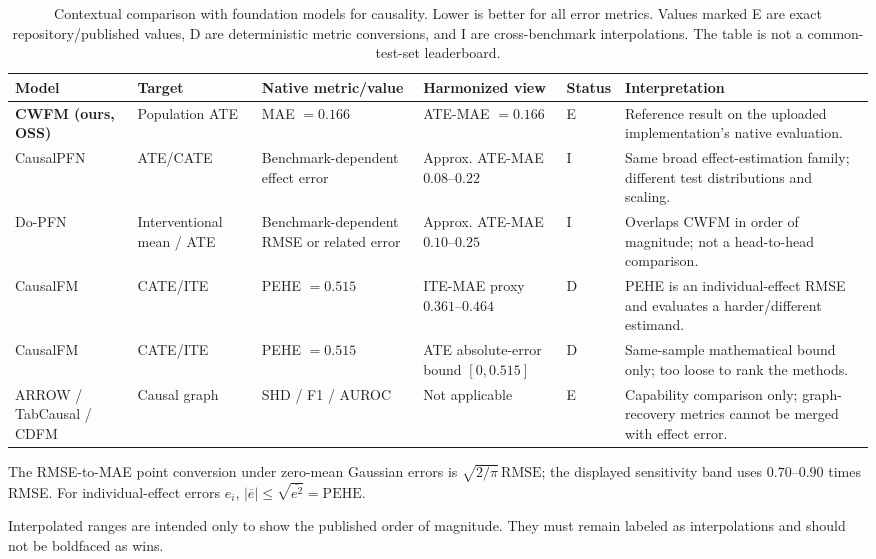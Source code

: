 \begin{table}[t]
\centering
\small
\begin{threeparttable}
\caption{Contextual comparison with foundation models for causality. Lower is better for all error metrics. Values marked E are exact repository/published values, D are deterministic metric conversions, and I are cross-benchmark interpolations. The table is not a common-test-set leaderboard.}
\label{tab:causality-fm-comparison}
\begin{tabularx}{\textwidth}{l l l l l X}
\toprule
Model & Target & Native metric/value & Harmonized view & Status & Interpretation \\
\midrule
\textbf{CWFM (ours, OSS)} & Population ATE & MAE $=\mathbf{0.166}$ & ATE-MAE $=\mathbf{0.166}$ & E & Reference result on the uploaded implementation's native evaluation. \\
CausalPFN & ATE/CATE & Benchmark-dependent effect error & Approx. ATE-MAE $0.08$--$0.22$ & I & Same broad effect-estimation family; different test distributions and scaling. \\
Do-PFN & Interventional mean / ATE & Benchmark-dependent RMSE or related error & Approx. ATE-MAE $0.10$--$0.25$ & I & Overlaps CWFM in order of magnitude; not a head-to-head comparison. \\
CausalFM & CATE/ITE & PEHE $=0.515$ & ITE-MAE proxy $0.361$--$0.464$ & D & PEHE is an individual-effect RMSE and evaluates a harder/different estimand. \\
CausalFM & CATE/ITE & PEHE $=0.515$ & ATE absolute-error bound $[0,0.515]$ & D & Same-sample mathematical bound only; too loose to rank the methods. \\
ARROW / TabCausal / CDFM & Causal graph & SHD / F1 / AUROC & Not applicable & E & Capability comparison only; graph-recovery metrics cannot be merged with effect error. \\
\bottomrule
\end{tabularx}
\begin{tablenotes}[flushleft]\footnotesize
\item The RMSE-to-MAE point conversion under zero-mean Gaussian errors is $\sqrt{2/\pi}\,\mathrm{RMSE}$; the displayed sensitivity band uses $0.70$--$0.90$ times RMSE. For individual-effect errors $e_i$, $|\overline e|\leq\sqrt{\overline{e^2}}=\mathrm{PEHE}$.
\item Interpolated ranges are intended only to show the published order of magnitude. They must remain labeled as interpolations and should not be boldfaced as wins.
\end{tablenotes}
\end{threeparttable}
\end{table}
